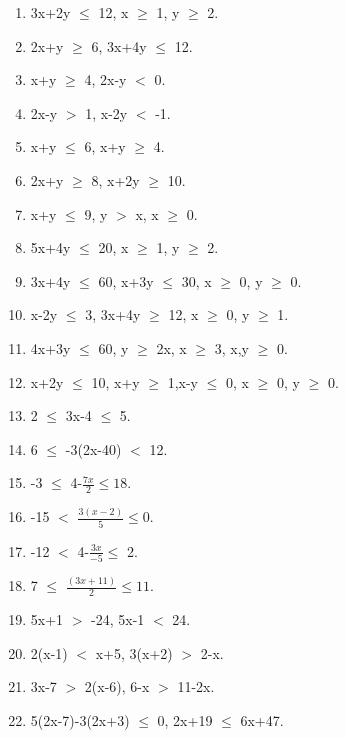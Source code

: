 \begin{enumerate}[label=\arabic*.,ref=\thesubsection.\theenumi]
    \item 3x+2y $\leq$ 12, x $\geq$ 1, y $\geq$ 2.
    \item 2x+y $\geq$ 6, 3x+4y $\leq$ 12.
    \item x+y $\geq$ 4, 2x-y $<$ 0.
    \item 2x-y $>$ 1, x-2y $<$ -1.
    \item x+y $\leq$ 6, x+y $\geq$ 4.
    \item 2x+y $\geq$ 8, x+2y $\geq$ 10.
    \item x+y $\leq$ 9, y $>$ x, x $\geq$ 0.
    \item 5x+4y $\leq$ 20, x $\geq$ 1, y $\geq$ 2.
    \item 3x+4y $\leq$ 60, x+3y $\leq$ 30, x $\geq$ 0, y $\geq$ 0.
    \item x-2y $\leq$ 3, 3x+4y $\geq$ 12, x $\geq$ 0, y $\geq$ 1.
    \item 4x+3y $\leq$ 60, y $\geq$ 2x, x $\geq$ 3, x,y $\geq$ 0.
    \item x+2y $\leq$ 10, x+y $\geq$ 1,x-y $\leq$ 0, x $\geq$ 0, 
    y $\geq$ 0.
    
 
    \item 2 $\leq$ 3x-4 $\leq$ 5.
    \item 6 $\leq$ -3(2x-40)  $<$ 12.
    \item -3 $\leq$ 4-$\frac{7x}{2} \leq 18$. 
    \item -15 $<$ $\frac{3(x-2)}{5} \leq 0$.
    \item -12 $<$ 4-$\frac{3x}{-5} \leq$ 2.
    \item 7 $\leq$ $\frac{(3x+11)}{2} \leq 11$.
    
    \item 5x+1 $>$ -24, 5x-1 $<$ 24.
    \item 2(x-1) $<$ x+5, 3(x+2) $>$ 2-x.
    \item 3x-7 $>$ 2(x-6), 6-x $>$ 11-2x.
    \item 5(2x-7)-3(2x+3) $\leq$ 0, 2x+19 $\leq$ 6x+47.
 \end{enumerate}
    
